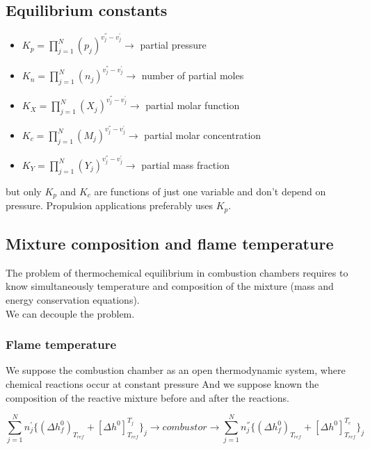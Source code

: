 \documentclass[12pt]{article}
\begin{document}
\subsection{Equilibrium constants}

\begin{itemize}
    \item $K_{p}=\prod_{j=1}^{N}(p_{j})^{{v_{j}^{''}}-{v_{j}^{'}}} \rightarrow$ partial pressure
    \item $K_{n}=\prod_{j=1}^{N}(n_{j})^{{v_{j}^{''}}-{v_{j}^{'}}} \rightarrow$ number of partial moles
    \item $K_{X}=\prod_{j=1}^{N}(X_{j})^{{v_{j}^{''}}-{v_{j}^{'}}} \rightarrow$ partial molar function
    \item $K_{c}=\prod_{j=1}^{N}(M_{j})^{{v_{j}^{''}}-{v_{j}^{'}}} \rightarrow$ partial molar concentration
    \item $K_{Y}=\prod_{j=1}^{N}(Y_{j})^{{v_{j}^{''}}-{v_{j}^{'}}} \rightarrow$ partial mass fraction
\end{itemize}
but only $K_{p}$ and $K_{c}$ are functions of just one variable and don't depend on pressure. Propulsion applications preferably uses $K_{p}$.

\subsection{Mixture composition and flame temperature}

The problem of thermochemical equilibrium in combustion chambers requires to know simultaneously temperature and composition of the mixture (mass and energy conservation equations).\\
We can decouple the problem.

\subsubsection{Flame temperature}

We suppose the combustion chamber as an open thermodynamic system, where chemical reactions occur at constant pressure And we suppose known the composition of the reactive mixture before and after the reactions.

\begin{equation}
    \sum_{j=1}^{N}n_{j}^{'}\{(\Delta h_{f}^{0})_{T_{ref}}+[\Delta h^{0}]_{T_{ref}}^{T_{j}}\}_{j} \rightarrow
    combustor
    \rightarrow
    \sum_{j=1}^{N}n_{j}^{''}\{(\Delta h_{f}^{0})_{T_{ref}}+[\Delta h^{0}]_{T_{ref}}^{T_{c}}\}_{j}
\end{equation}
\end{document}
